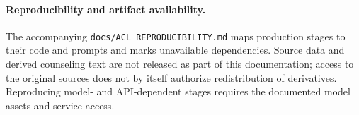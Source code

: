 \paragraph{Reproducibility and artifact availability.}
The accompanying \texttt{docs/ACL\_REPRODUCIBILITY.md} maps production stages to their code and prompts and marks unavailable dependencies.
Source data and derived counseling text are not released as part of this documentation; access to the original sources does not by itself authorize redistribution of derivatives.
Reproducing model- and API-dependent stages requires the documented model assets and service access.
